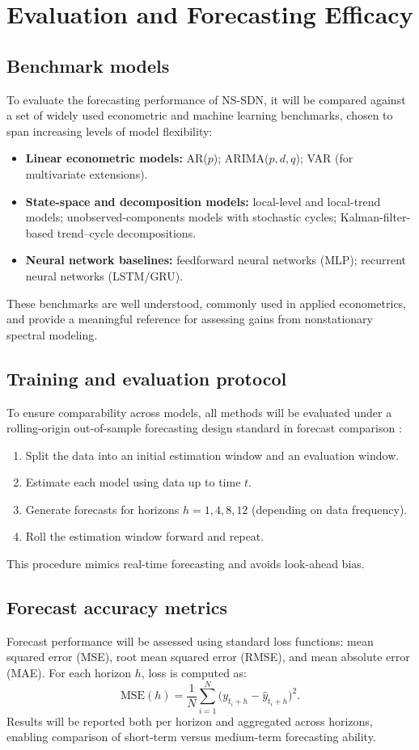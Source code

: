 \section{Evaluation and Forecasting Efficacy}
\subsection{Benchmark models}
To evaluate the forecasting performance of NS-SDN, it will be compared against a set of widely used econometric and machine learning benchmarks, chosen to span increasing levels of model flexibility:
\begin{itemize}
\item \textbf{Linear econometric models:} AR($p$); ARIMA($p,d,q$); VAR (for multivariate extensions).
\item \textbf{State-space and decomposition models:} local-level and local-trend models; unobserved-components models with stochastic cycles; Kalman-filter-based trend--cycle decompositions.
\item \textbf{Neural network baselines:} feedforward neural networks (MLP); recurrent neural networks (LSTM/GRU).
\end{itemize}
These benchmarks are well understood, commonly used in applied econometrics, and provide a meaningful reference for assessing gains from nonstationary spectral modeling.

\subsection{Training and evaluation protocol}
To ensure comparability across models, all methods will be evaluated under a rolling-origin out-of-sample forecasting design standard in forecast comparison \citep{west1996}:
\begin{enumerate}
\item Split the data into an initial estimation window and an evaluation window.
\item Estimate each model using data up to time $t$.
\item Generate forecasts for horizons $h = 1, 4, 8, 12$ (depending on data frequency).
\item Roll the estimation window forward and repeat.
\end{enumerate}
This procedure mimics real-time forecasting and avoids look-ahead bias.

\subsection{Forecast accuracy metrics}
Forecast performance will be assessed using standard loss functions: mean squared error (MSE), root mean squared error (RMSE), and mean absolute error (MAE). For each horizon $h$, loss is computed as:
\begin{equation}
\mathrm{MSE}(h) = \frac{1}{N}\sum_{i=1}^N \big(y_{t_i+h} - \hat y_{t_i+h}\big)^2.
\end{equation}
Results will be reported both per horizon and aggregated across horizons, enabling comparison of short-term versus medium-term forecasting ability.

